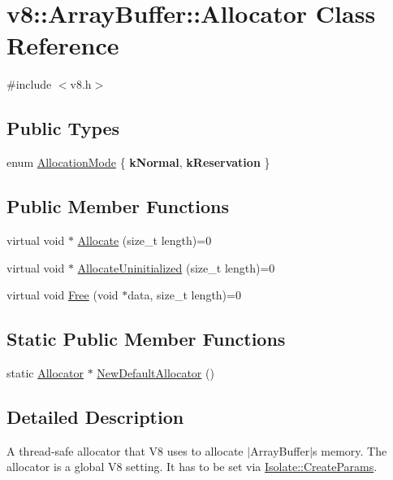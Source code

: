\hypertarget{classv8_1_1ArrayBuffer_1_1Allocator}{}\section{v8\+:\+:Array\+Buffer\+:\+:Allocator Class Reference}
\label{classv8_1_1ArrayBuffer_1_1Allocator}


{\ttfamily \#include $<$v8.\+h$>$}

\subsection*{Public Types}
\begin{DoxyCompactItemize}
\item 
enum \mbox{\hyperlink{classv8_1_1ArrayBuffer_1_1Allocator_ab106d1fbad7be9f6fd8b0f5c550ac59e}{Allocation\+Mode}} \{ {\bfseries k\+Normal}, 
{\bfseries k\+Reservation}
 \}
\end{DoxyCompactItemize}
\subsection*{Public Member Functions}
\begin{DoxyCompactItemize}
\item 
virtual void $\ast$ \mbox{\hyperlink{classv8_1_1ArrayBuffer_1_1Allocator_a106b0d80120ed04fe9b9675e96f0340b}{Allocate}} (size\+\_\+t length)=0
\item 
virtual void $\ast$ \mbox{\hyperlink{classv8_1_1ArrayBuffer_1_1Allocator_a92b2d5c0a826d3c435e12f3ee178f37a}{Allocate\+Uninitialized}} (size\+\_\+t length)=0
\item 
virtual void \mbox{\hyperlink{classv8_1_1ArrayBuffer_1_1Allocator_a419f59d2a103a5a8863809d7977c9cd8}{Free}} (void $\ast$data, size\+\_\+t length)=0
\end{DoxyCompactItemize}
\subsection*{Static Public Member Functions}
\begin{DoxyCompactItemize}
\item 
static \mbox{\hyperlink{classv8_1_1ArrayBuffer_1_1Allocator}{Allocator}} $\ast$ \mbox{\hyperlink{classv8_1_1ArrayBuffer_1_1Allocator_ab274d606bbc87a2a41f114d55d6da331}{New\+Default\+Allocator}} ()
\end{DoxyCompactItemize}


\subsection{Detailed Description}
A thread-\/safe allocator that V8 uses to allocate $\vert$\+Array\+Buffer$\vert$\textquotesingle{}s memory. The allocator is a global V8 setting. It has to be set via \mbox{\hyperlink{structv8_1_1Isolate_1_1CreateParams}{Isolate\+::\+Create\+Params}}.

